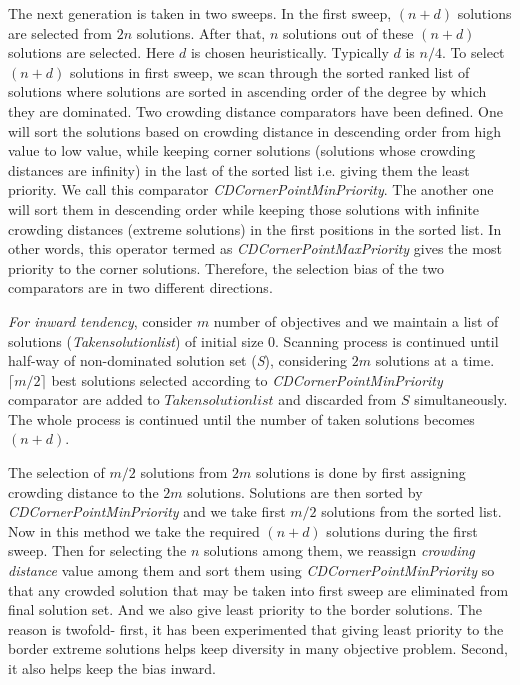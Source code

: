 \documentclass[journal]{IEEEtran}
\begin{document}
The next generation is taken in two sweeps. In the first sweep, $(n+d)$ solutions are selected from $2n$ solutions. After that, $n$ solutions out of these $(n+d)$ solutions are selected. Here $d$ is chosen heuristically. Typically $d$ is $n/4$. To select $(n+d)$ solutions in first sweep, we scan through the sorted ranked list of solutions where solutions are sorted in ascending order of the degree by which they are dominated.
Two crowding distance comparators have been defined. One will sort the solutions based on crowding distance in descending order from high value to low value, while keeping corner solutions (solutions whose crowding distances are infinity) in the last of the sorted list i.e. giving them the least priority. We call this comparator \textit{CDCornerPointMinPriority}. The another one will sort them in descending order while keeping those solutions with infinite crowding distances (extreme solutions) in the first positions in the sorted list. In other words, this operator termed as \textit{CDCornerPointMaxPriority} gives the most priority to the corner solutions. Therefore, the selection bias of the two comparators are in two different directions.

\textit{For inward tendency}, consider $m$ number of objectives and we maintain a list of solutions (\textit{Takensolutionlist}) of  initial size $0$. Scanning process is continued until half-way of non-dominated solution set (\textit{S}), considering $2m$ solutions at a time. $\lceil m/2\rceil$ best solutions selected according to \textit{CDCornerPointMinPriority} comparator are added to $Takensolutionlist$ and discarded from $S$ simultaneously. The whole process is continued until the number of taken solutions becomes $(n+d)$.

The selection of $m/2$ solutions from $2m$ solutions is done by first assigning crowding distance to the $2m$ solutions. Solutions are then sorted by \textit{CDCornerPointMinPriority} and we take first $m/2$ solutions from the sorted list.
Now in this method we take the required $(n+d)$ solutions during the first sweep. Then for selecting the $n$ solutions among them, we reassign \textit{crowding distance} value among them and sort them using \textit{CDCornerPointMinPriority} so that any crowded solution that may be taken into first sweep are eliminated from final solution set. And we also give least priority to the border solutions. The reason is twofold- first, it has been experimented that giving least priority to the border extreme solutions helps keep diversity in many objective problem. Second, it also helps keep the bias inward.
\end{document}

